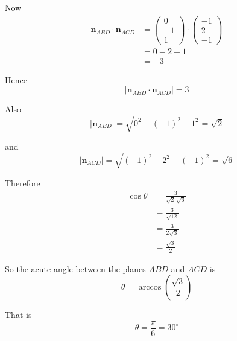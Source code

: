 \documentclass[leqno]{article}
\begin{document}
\begin{enumerate}[
  label=\textbf{\arabic*.},
  leftmargin=*,
  topsep=0pt,
  partopsep=0pt,
  parsep=0pt
]
\begin{djsSolution}
\begin{enumerate}[label=\textbf{(\alph*)}]
Now
\begin{align*}
\mathbf n_{ABD}\cdot \mathbf n_{ACD}
&=\begin{pmatrix}0\\-1\\1\end{pmatrix}\cdot\begin{pmatrix}-1\\2\\-1\end{pmatrix} \\
&=0-2-1 \\
&=-3
\end{align*}

Hence
\[
\left\lvert \mathbf n_{ABD}\cdot \mathbf n_{ACD}\right\rvert=3
\]

Also
\[
\left\lvert \mathbf n_{ABD}\right\rvert=\sqrt{0^2+(-1)^2+1^2}=\sqrt{2}
\]

and
\[
\left\lvert \mathbf n_{ACD}\right\rvert=\sqrt{(-1)^2+2^2+(-1)^2}=\sqrt{6}
\]

Therefore
\begin{align*}
\cos\theta
&=\frac{3}{\sqrt{2}\,\sqrt{6}} \\
&=\frac{3}{\sqrt{12}} \\
&=\frac{3}{2\sqrt{3}} \\
&=\frac{\sqrt{3}}{2}
\end{align*}

So the acute angle between the planes \(ABD\) and \(ACD\) is
\[
\theta=\arccos\left(\frac{\sqrt{3}}{2}\right)
\]

That is
\[
\theta=\frac{\pi}{6}=30^\circ
\]
\end{enumerate}
\end{djsSolution}

\end{enumerate}
\end{document}
